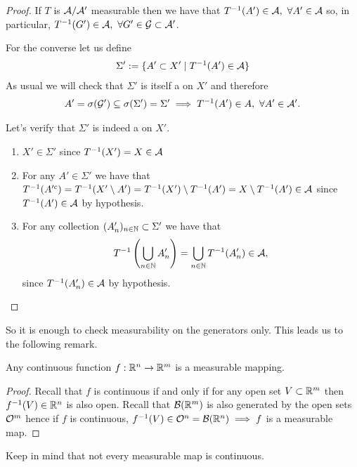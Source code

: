 \begin{proof}
	If $T$ is $\mathcal{A}/\mathcal{A}'$ measurable then we have that ${T}^{-1}(A') \in \mathcal{A},\ \forall A' \in \mathcal{A}$ so, in particular, ${T}^{-1}(G') \in \mathcal{A},\ \forall G' \in \mathcal{G} \subset \mathcal{A}'$.
	
	For the converse let us define
	\begin{align*}
		\Sigma' := \{ A' \subset X' \mid {T}^{-1}(A') \in \mathcal{A} \}
	\end{align*}
	As usual we will check that $\Sigma'$ is itself a \siga on $X'$ and therefore
	\begin{align*}
		A' = \sigma(\mathcal{G}') \subseteq \sigma(\Sigma') = \Sigma' \implies {T}^{-1}(A') \in A,\ \forall A' \in \mathcal{A}'.
	\end{align*}
	
	Let's verify that $\Sigma'$ is indeed a \siga on $X'$.
	\begin{enumerate}
		\item $X' \in \Sigma'$ since ${T}^{-1}(X') = X \in \mathcal{A}$
		\item For any $A' \in \Sigma'$ we have that ${T}^{-1}(A'^c) = {T}^{-1}(X' \setminus A') = {T}^{-1}(X') \setminus {T}^{-1}(A') = X \setminus {T}^{-1}(A') \in \mathcal{A}$ since ${T}^{-1}(A') \in \mathcal{A}$ by hypothesis.
		\item For any collection $(A'_n)_{n\in\mathbb{N}} \subset \Sigma'$ we have that
		\begin{align*}
			{T}^{-1}\left(\bigcup_{n\in\mathbb{N}} A'_n\right) = \bigcup_{n\in\mathbb{N}} {T}^{-1}(A_n') \in \mathcal{A},
		\end{align*}
		since ${T}^{-1}(A_n') \in \mathcal{A}$ by hypothesis.
	\end{enumerate}
\end{proof}

So it is enough to check measurability on the generators only. This leads us to the following remark.

\begin{remark}
	Any continuous function $f: \mathbb{R}^n \to \mathbb{R}^m$ is a measurable mapping.
\end{remark}

\begin{proof}
	Recall that $f$ is continuous if and only if for any open set $V \subset \mathbb{R}^m$ then ${f}^{-1}(V) \in \mathbb{R}^n$ is also open. Recall that $\mathcal{B}(\mathbb{R}^m)$ is also generated by the open sets $\mathcal{O}^m$ hence if $f$ is continuous, ${f}^{-1}(V) \in \mathcal{O}^n = \mathcal{B}(\mathbb{R}^n) \implies f$ is a measurable map.
\end{proof}

Keep in mind that not every measurable map is continuous.

